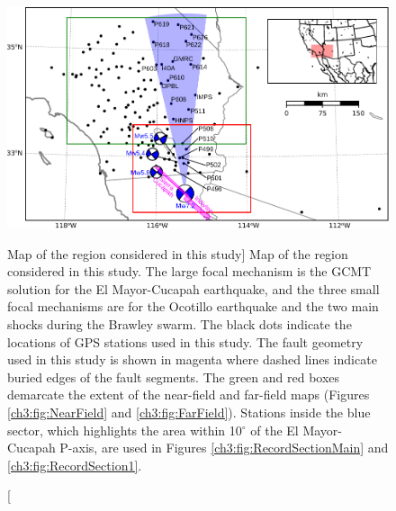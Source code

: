 \begin{figure}
\includegraphics[scale=1.0]{ch3/figures/2016jb013114-p01} 
\caption
[Map of the region considered in this study]
{Map of the region considered in this study.  The large focal
mechanism is the GCMT solution for the El Mayor-Cucapah earthquake,
and the three small focal mechanisms are for the Ocotillo earthquake
and the two main shocks during the Brawley swarm.  The black dots
indicate the locations of GPS stations used in this study.  The fault
geometry used in this study is shown in magenta where dashed lines
indicate buried edges of the fault segments.  The green and red boxes
demarcate the extent of the near-field and far-field maps (Figures
\ref{ch3:fig:NearField} and \ref{ch3:fig:FarField}).  Stations inside
the blue sector, which highlights the area within 10$^\circ$ of the El
Mayor-Cucapah P-axis, are used in Figures
\ref{ch3:fig:RecordSectionMain} and \ref{ch3:fig:RecordSection1}.}
\label{ch3:fig:ContextMap}
\end{figure}

